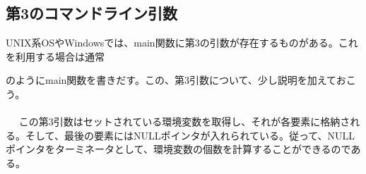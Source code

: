\subsection{第3のコマンドライン引数}
UNIX系OSやWindowsでは、main関数に第3の引数が存在するものがある。これを利用する場合は通常
\begin{code}
int main(int argc, char *argv[], char *envp[]){
\end{code}
のようにmain関数を書きだす。この、第3引数について、少し説明を加えておこう。
\\ \\　
この第3引数はセットされている環境変数を取得し、それが各要素に格納される。そして、最後の要素にはNULLポインタが入れられている。従って、NULLポインタをターミネータとして、環境変数の個数を計算することができるのである。

\newpage

